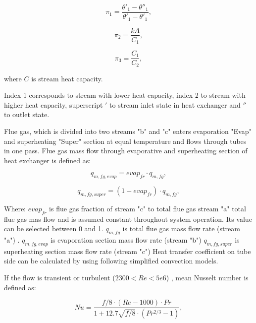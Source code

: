 \documentclass{article}
\begin{document}
	\begin{equation}\label{eq:pi_params}
		\pi_1 = \frac{\theta'_1 - \theta''_1}{\theta'_1 - \theta'_1},
	\end{equation}
	
	\begin{equation}\label{eq:pi_params2}
		\pi_2 = \frac{kA}{C_1},
	\end{equation}
	
	\begin{equation}\label{eq:pi_params3}
		\pi_3 = \frac{C_1}{C_2},
	\end{equation}
	
	\noindent
	where $C$ is stream heat capacity.
	
	Index 1 corresponds to stream with lower heat capacity, index 2 to stream with higher heat capacity, superscript $'$ to stream inlet state in heat exchanger and $''$ to outlet state.
	
	Flue gas, which is divided into two streams "b" and "c" enters evaporation "Evap" and superheating "Super" section at equal temperature and flows through tubes in one pass. Flue gas mass flow through evaporative and superheating section of heat exchanger is defined as:
	
	\begin{equation}\label{eq:flue_gas_flow1}
		q_{m,fg,evap} = evap_{fr} \cdot q_{m,fg},
	\end{equation}
	
	\begin{equation}\label{eq:flue_gas_flow2}
		q_{m,fg,super} = (1-evap_{fr}) \cdot q_{m,fg},
	\end{equation}
	
	\noindent
	Where:
	$evap_{fr}$ is flue gas fraction of stream "c" to total flue gas stream "a"  total flue gas mas flow and is assumed constant throughout system operation. Its value can be selected between 0 and 1.
	$q_{m,fg}$ is total flue gas mass flow rate (stream "a") .
	$q_{m,fg,evap}$ is evaporation section mass flow rate (stream "b")
	$q_{m,fg,super}$ is superheating section mass flow rate (stream "c")
	Heat transfer coefficient on tube side can be calculated by using following simplified convection models.
	
	\noindent
	If the flow is transient or turbulent ($2300 < Re < 5e6$) , mean Nusselt number is defined as:
	
	\begin{equation}\label{eq:nusselt}
		Nu = \frac{f/8 \cdot (Re - 1000) \cdot Pr}{1+12.7\sqrt{f/8} \cdot (Pr^{2/3}-1)},
	\end{equation}
	
\end{document}
